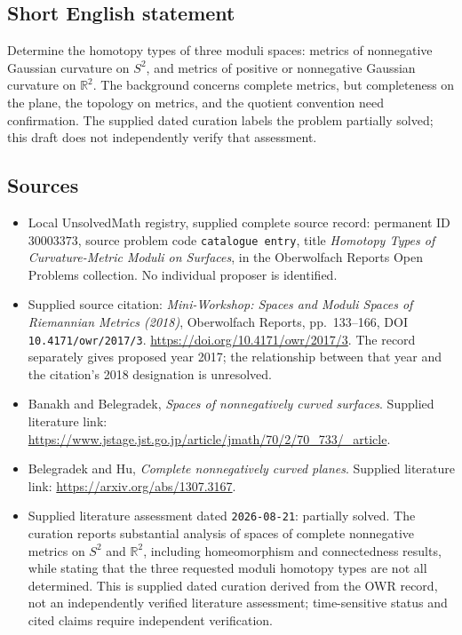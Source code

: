 \documentclass[11pt]{article}
\newcommand{\R}{\mathbb{R}}
\begin{document}
\subsection{Short English statement}
Determine the homotopy types of three moduli spaces: metrics of nonnegative Gaussian curvature on \(S^2\), and metrics of positive or nonnegative Gaussian curvature on \(\R^2\). The background concerns complete metrics, but completeness on the plane, the topology on metrics, and the quotient convention need confirmation. The supplied dated curation labels the problem partially solved; this draft does not independently verify that assessment.
\subsection{Sources}
\begin{itemize}
\item Local UnsolvedMath registry, supplied complete source record: permanent ID \(30003373\), source problem code \texttt{catalogue entry}, title \emph{Homotopy Types of Curvature-Metric Moduli on Surfaces}, in the Oberwolfach Reports Open Problems collection. No individual proposer is identified.
\item Supplied source citation: \emph{Mini-Workshop: Spaces and Moduli Spaces of Riemannian Metrics (2018)}, Oberwolfach Reports, pp.~133--166, DOI \texttt{10.4171/owr/2017/3}. \url{https://doi.org/10.4171/owr/2017/3}. The record separately gives proposed year 2017; the relationship between that year and the citation's 2018 designation is unresolved.
\item Banakh and Belegradek, \emph{Spaces of nonnegatively curved surfaces}. Supplied literature link: \url{https://www.jstage.jst.go.jp/article/jmath/70/2/70_733/_article}.
\item Belegradek and Hu, \emph{Complete nonnegatively curved planes}. Supplied literature link: \url{https://arxiv.org/abs/1307.3167}.
\item Supplied literature assessment dated \texttt{2026-08-21}: partially solved. The curation reports substantial analysis of spaces of complete nonnegative metrics on \(S^2\) and \(\R^2\), including homeomorphism and connectedness results, while stating that the three requested moduli homotopy types are not all determined. This is supplied dated curation derived from the OWR record, not an independently verified literature assessment; time-sensitive status and cited claims require independent verification.
\end{itemize}
\end{document}
